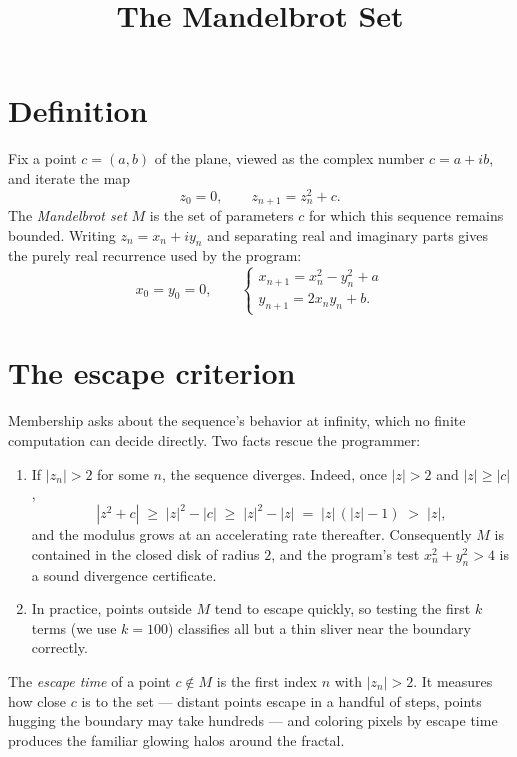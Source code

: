 \documentclass[11pt]{article}
\title{The Mandelbrot Set}
\author{}
\date{}
\begin{document}
\maketitle
\thispagestyle{fancy}

\section{Definition}

Fix a point $c = (a, b)$ of the plane, viewed as the complex number
$c = a + ib$, and iterate the map
\begin{equation}
  z_0 = 0, \qquad z_{n+1} = z_n^2 + c.
\end{equation}
The \emph{Mandelbrot set} $M$ is the set of parameters $c$ for which this
sequence remains bounded. Writing $z_n = x_n + i y_n$ and separating real and
imaginary parts gives the purely real recurrence used by the program:
\begin{equation}
  x_0 = y_0 = 0, \qquad
  \begin{cases}
    x_{n+1} = x_n^2 - y_n^2 + a \\
    y_{n+1} = 2 x_n y_n + b.
  \end{cases}
\end{equation}

\section{The escape criterion}

Membership asks about the sequence's behavior at infinity, which no finite
computation can decide directly. Two facts rescue the programmer:
\begin{enumerate}
  \item If $|z_n| > 2$ for some $n$, the sequence diverges. Indeed, once
    $|z| > 2$ and $|z| \geq |c|$,
    \[
      |z^2 + c| \;\geq\; |z|^2 - |c| \;\geq\; |z|^2 - |z|
      \;=\; |z|\,(|z| - 1) \;>\; |z|,
    \]
    and the modulus grows at an accelerating rate thereafter. Consequently
    $M$ is contained in the closed disk of radius $2$, and the program's test
    $x_n^2 + y_n^2 > 4$ is a sound divergence certificate.
  \item In practice, points outside $M$ tend to escape quickly, so testing the
    first $k$ terms (we use $k = 100$) classifies all but a thin sliver
    near the boundary correctly.
\end{enumerate}

The \emph{escape time} of a point $c \notin M$ is the first index $n$ with
$|z_n| > 2$. It measures how close $c$ is to the set --- distant points escape
in a handful of steps, points hugging the boundary may take hundreds --- and
coloring pixels by escape time produces the familiar glowing halos around the
fractal.
\end{document}
